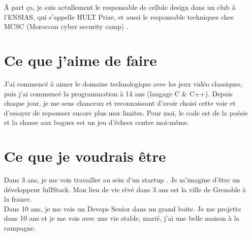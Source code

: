 \documentclass[a4paper, 12pt,french,oneside]{book}%
\theoremstyle{definition}
\theoremstyle{remark}
\begin{document}
Â part ça, je suis actullement le responsable de  cellule design dans un club à l'ENSIAS, qui s'appelle HULT Prize, et aussi le responsable techniques ches MCSC (Moroccan cyber security camp) .
\section{Ce que j'aime de faire}
J'ai commencé à aimer le domaine technologique avec les jeux vidéo classiques, puis j'ai commencé la programmation à 14 ans (langage C \& C++). Depuis chaque jour, je me sens chanceux et reconnaissant d'avoir choisi cette voie et d'essayer de repousser encore plus mes limites. Pour moi, le code est de la poésie et la chasse aux bogues est un jeu d'échecs contre moi-même.
\section{Ce que je voudrais être}
Dans 3 ans, je me vois travailler au sein d'un startup . Je m'imagine d'être un développeur fullStack. Mon lieu de vie rêvé dans 3 ans est la ville de Grenoble à la france.\\

Dans 10 ans, je me vois un Devops Senior dans un grand boite. 
Je me projette dans 10 ans et je me vois avec une vie  stable, marié, j'ai une belle maison à la campagne.
\end{document}
